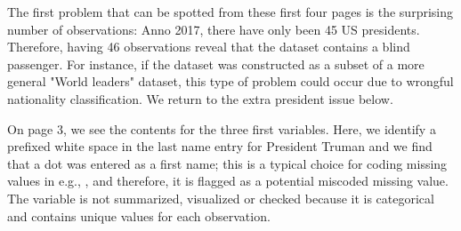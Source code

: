 \documentclass[article,shortnames]{jss}
\begin{document}
The first problem that can be spotted from these first four pages is the surprising number of observations: Anno 2017, there have only been 45 US presidents. Therefore, having 46 observations reveal that the dataset contains a blind passenger. For instance, if the dataset was constructed as a subset of a more general "World leaders" dataset, this type of problem could occur due to wrongful nationality classification. We return to the extra president issue below. 

On page 3, we see the contents for the three first variables. Here, we identify a prefixed white space in the last name entry for President Truman and we find that a dot was entered as a first name; this is a typical choice for coding missing values in e.g.,  \citep{stata}, and therefore, it is flagged as a potential miscoded missing value. The variable  is not summarized, visualized or checked because it is categorical and contains unique values for each observation. 
\end{document}

